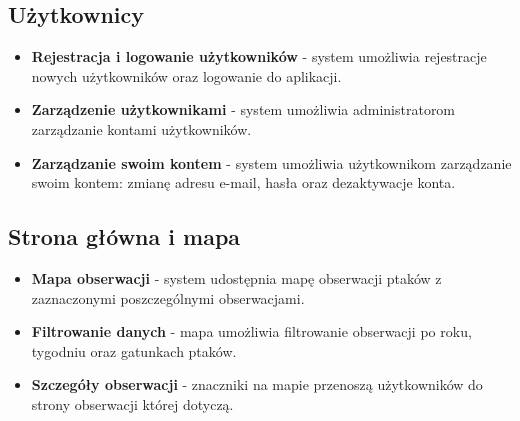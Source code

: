 \subsection{Użytkownicy}
\begin{itemize}
	\item \textbf{Rejestracja i logowanie użytkowników} - system umożliwia rejestracje nowych użytkowników oraz logowanie do aplikacji.
	\item \textbf{Zarządzenie użytkownikami} - system umożliwia administratorom zarządzanie kontami użytkowników.
	\item \textbf{Zarządzanie swoim kontem} - system umożliwia użytkownikom zarządzanie swoim kontem: zmianę adresu e-mail, hasła oraz dezaktywacje konta.
\end{itemize}

\subsection{Strona główna i mapa}
\begin{itemize}
	\item \textbf{Mapa obserwacji} - system udostępnia mapę obserwacji ptaków z zaznaczonymi poszczególnymi obserwacjami.
	\item \textbf{Filtrowanie danych} - mapa umożliwia filtrowanie obserwacji po roku, tygodniu oraz gatunkach ptaków.
	\item \textbf{Szczegóły obserwacji} - znaczniki na mapie przenoszą użytkowników do strony obserwacji której dotyczą.
\end{itemize}

